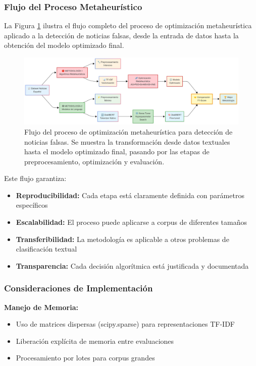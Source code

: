 \subsubsection{Flujo del Proceso Metaheurístico}

La Figura \ref{fig:flujo_metaheuristicas} ilustra el flujo completo del proceso de optimización metaheurística aplicado a la detección de noticias falsas, desde la entrada de datos hasta la obtención del modelo optimizado final.

\begin{figure}[h!]
    \centering
    \includegraphics[width=\textwidth]{Imagenes/figura2Flujo.png}
    \caption{Flujo del proceso de optimización metaheurística para detección de noticias falsas. Se muestra la transformación desde datos textuales hasta el modelo optimizado final, pasando por las etapas de preprocesamiento, optimización y evaluación.}
    \label{fig:flujo_metaheuristicas}
\end{figure}

Este flujo garantiza:
\begin{itemize}
    \item \textbf{Reproducibilidad:} Cada etapa está claramente definida con parámetros específicos
    \item \textbf{Escalabilidad:} El proceso puede aplicarse a corpus de diferentes tamaños
    \item \textbf{Transferibilidad:} La metodología es aplicable a otros problemas de clasificación textual
    \item \textbf{Transparencia:} Cada decisión algorítmica está justificada y documentada
\end{itemize}

\subsubsection{Consideraciones de Implementación}

\textbf{Manejo de Memoria:}
\begin{itemize}
    \item Uso de matrices dispersas (scipy.sparse) para representaciones TF-IDF
    \item Liberación explícita de memoria entre evaluaciones
    \item Procesamiento por lotes para corpus grandes
\end{itemize}

